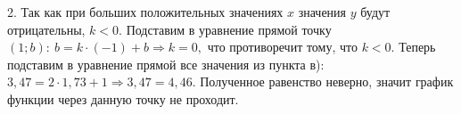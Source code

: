 2. Так как при больших положительных значениях $x$ значения $y$ будут отрицательны, $k<0.$ Подставим в уравнение прямой точку $(1;b):\ b=k\cdot(-1)+b \Rightarrow k=0,$ что противоречит тому, что $k<0.$ Теперь подставим в уравнение прямой все значения из пункта в): $3,47=2\cdot1,73+1\Rightarrow3,47=4,46.$ Полученное равенство неверно, значит график функции через данную точку не проходит.\\
